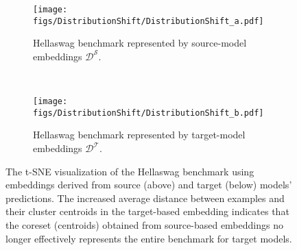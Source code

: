 \begin{figure*}[t]
    \centering
    \begin{subfigure}[b]{0.95\textwidth}
        \texttt{[image: figs/DistributionShift/DistributionShift\_a.pdf]}
        \caption{Hellaswag benchmark represented by source-model embeddings $\mathcal{D}^\mathcal{S}$.}
        \label{FigDistShift_a}
    \end{subfigure}\\
    \begin{subfigure}[b]{0.95\textwidth}
        \texttt{[image: figs/DistributionShift/DistributionShift\_b.pdf]}
        \caption{Hellaswag benchmark represented by target-model embeddings $\mathcal{D}^\mathcal{T}$.}
        \label{FigDistShift_b}
    \end{subfigure}
    \vspace{-0.15cm}
    \caption{The t-SNE visualization of the Hellaswag benchmark using embeddings derived from source (above) and target (below) models' predictions. The increased average distance between examples and their cluster centroids in the target-based embedding indicates that the coreset (centroids) obtained from source-based embeddings no longer effectively represents the entire benchmark for target models.}
    \label{FigDistShift}
    \vspace{-0.5cm}
\end{figure*}

